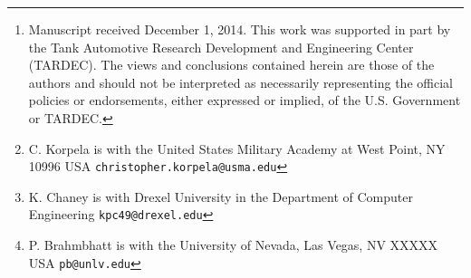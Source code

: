 \author{Christopher Korpela, Kenneth Chaney, and Pareshkumar Brahmbhatt
\thanks{Manuscript received December 1, 2014. This work was supported in part by the Tank Automotive Research Development and Engineering Center (TARDEC). The views and conclusions contained herein are those of the authors and should not be interpreted as necessarily representing the official policies or endorsements, either expressed or implied, of the U.S. Government or TARDEC.}
\thanks{C. Korpela is with the United States Military Academy at West Point, NY 10996 USA \tt\small{christopher.korpela{@}usma.edu}}
\thanks{K. Chaney is with Drexel University in the Department of Computer Engineering \tt\small{kpc49{@}drexel.edu}}
\thanks{P. Brahmbhatt is with the University of Nevada, Las Vegas, NV XXXXX USA \tt\small{pb{@}unlv.edu}}}
